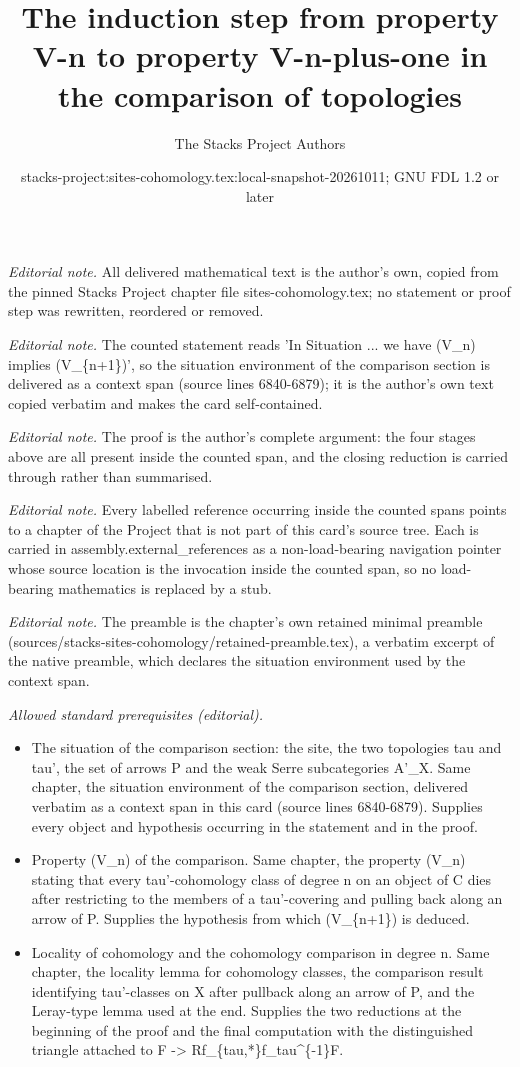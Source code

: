 \documentclass[10pt,a4paper]{amsart}
\title{The induction step from property V-n to property V-n-plus-one in the comparison of topologies}
\author{The Stacks Project Authors}
\date{stacks-project:sites-cohomology.tex:local-snapshot-20261011; GNU FDL 1.2 or later}
\theoremstyle{plain}
\theoremstyle{definition}
\theoremstyle{remark}
\numberwithin{equation}{subsection}
\begin{document}
\maketitle
\noindent\textit{Editorial note.} All delivered mathematical text is the author's own, copied from the pinned Stacks Project chapter file sites-cohomology.tex; no statement or proof step was rewritten, reordered or removed.\par\medskip
\noindent\textit{Editorial note.} The counted statement reads 'In Situation ... we have (V\_n) implies (V\_\{n+1\})', so the situation environment of the comparison section is delivered as a context span (source lines 6840-6879); it is the author's own text copied verbatim and makes the card self-contained.\par\medskip
\noindent\textit{Editorial note.} The proof is the author's complete argument: the four stages above are all present inside the counted span, and the closing reduction is carried through rather than summarised.\par\medskip
\noindent\textit{Editorial note.} Every labelled reference occurring inside the counted spans points to a chapter of the Project that is not part of this card's source tree. Each is carried in assembly.external\_references as a non-load-bearing navigation pointer whose source location is the invocation inside the counted span, so no load-bearing mathematics is replaced by a stub.\par\medskip
\noindent\textit{Editorial note.} The preamble is the chapter's own retained minimal preamble (sources/stacks-sites-cohomology/retained-preamble.tex), a verbatim excerpt of the native preamble, which declares the situation environment used by the context span.\par\medskip
\noindent\textit{Allowed standard prerequisites (editorial).}\begin{itemize}
\item The situation of the comparison section: the site, the two topologies tau and tau', the set of arrows P and the weak Serre subcategories A'\_X. Same chapter, the situation environment of the comparison section, delivered verbatim as a context span in this card (source lines 6840-6879). Supplies every object and hypothesis occurring in the statement and in the proof.
\item Property (V\_n) of the comparison. Same chapter, the property (V\_n) stating that every tau'-cohomology class of degree n on an object of C dies after restricting to the members of a tau'-covering and pulling back along an arrow of P. Supplies the hypothesis from which (V\_\{n+1\}) is deduced.
\item Locality of cohomology and the cohomology comparison in degree n. Same chapter, the locality lemma for cohomology classes, the comparison result identifying tau'-classes on X after pullback along an arrow of P, and the Leray-type lemma used at the end. Supplies the two reductions at the beginning of the proof and the final computation with the distinguished triangle attached to F -> Rf\_\{tau,*\}f\_tau\textasciicircum{}\{-1\}F.
\end{itemize}\medskip
\end{document}
